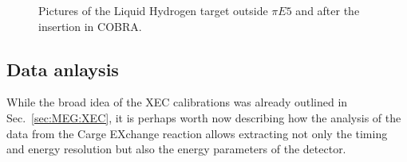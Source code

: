 \begin{refsection}
        \begin{figure}
            \centering
            \caption{Pictures of the Liquid Hydrogen target outside $\pi E5$ and after the insertion in COBRA.}
            \label{fig:CEX:2021:installation}
        \end{figure}

    \subsection{Data anlaysis}
        While the broad idea of the XEC calibrations was already outlined in Sec.~\ref{sec:MEG:XEC}, it is perhaps worth now describing how the analysis of the data from the Carge EXchange reaction allows extracting not only the timing and energy resolution but also the energy parameters of the detector.
        

\end{refsection}
